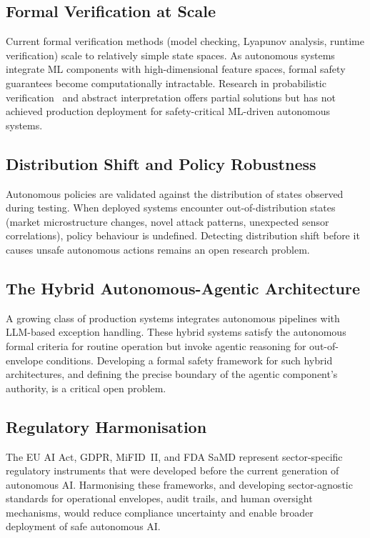 \documentclass[12pt, a4paper]{article}
\begin{document}
\subsection{Formal Verification at Scale}
Current formal verification methods (model checking, Lyapunov analysis, runtime verification) scale to relatively simple state spaces. As autonomous systems integrate ML components with high-dimensional feature spaces, formal safety guarantees become computationally intractable. Research in probabilistic verification~\citep{kwiatkowska2020probabilistic} and abstract interpretation offers partial solutions but has not achieved production deployment for safety-critical ML-driven autonomous systems.

\subsection{Distribution Shift and Policy Robustness}
Autonomous policies are validated against the distribution of states observed during testing. When deployed systems encounter out-of-distribution states (market microstructure changes, novel attack patterns, unexpected sensor correlations), policy behaviour is undefined. Detecting distribution shift before it causes unsafe autonomous actions remains an open research problem.

\subsection{The Hybrid Autonomous-Agentic Architecture}
A growing class of production systems integrates autonomous pipelines with LLM-based exception handling. These hybrid systems satisfy the autonomous formal criteria for routine operation but invoke agentic reasoning for out-of-envelope conditions. Developing a formal safety framework for such hybrid architectures, and defining the precise boundary of the agentic component's authority, is a critical open problem.

\subsection{Regulatory Harmonisation}
The EU AI Act, GDPR, MiFID~II, and FDA SaMD represent sector-specific regulatory instruments that were developed before the current generation of autonomous AI. Harmonising these frameworks, and developing sector-agnostic standards for operational envelopes, audit trails, and human oversight mechanisms, would reduce compliance uncertainty and enable broader deployment of safe autonomous AI.
\end{document}
